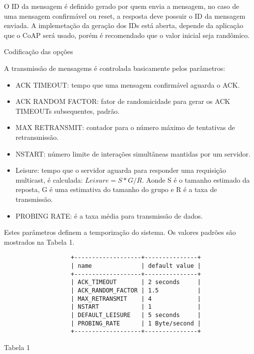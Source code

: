 O ID da mensagem \'e definido gerado por quem envia a mensagem, no caso de uma mensagem confirm\'avel ou reset, a resposta deve possuir o ID da mensagem enviada. A implemeta\c{c}\~ao da gera\c{c}\~ao dos IDs est\'a aberta, depende da aplica\c{c}\~ao que o CoAP ser\'a usado, por\'em \'e recomendado que o valor inicial seja rand\^omico.
   
Codifica\c{c}\~ao das op\c{c}\~oes

A transmiss\~ao de mensagems \'e controlada basicamente pelos par\^ametros:

\begin{itemize}
    \item ACK TIMEOUT: tempo que uma mensagem confirm\'avel aguarda o ACK.
    \item ACK RANDOM FACTOR: fator de randomicidade para gerar os ACK TIMEOUTs subsequentes, padr\~ao.
    \item MAX RETRANSMIT: contador para o n\'umero m\'aximo de tentativas de retransmiss\~ao.
    \item NSTART: n\'umero limite de intera\c{c}\~oes simult\^aneas mantidas por um servidor.
    \item Leisure: tempo que o servidor aguarda para responder uma requisi\c{c}\~ao multicast, \'e calculada: \begin{math}Leisure = S * G / R\end{math}. Aonde S \'e o tamanho estimado da reposta, G \'e uma estimativa do tamanho do grupo e R \'e a taxa de transmiss\~ao.
    \item PROBING RATE: \'e a taxa m\'edia para transmiss\~ao de dados.
\end{itemize}

Estes par\^ametros definem a temporiza\c{c}\~ao do sistema. Os valores padr\~oes s\~ao mostrados na Tabela 1.

\begin{verbatim}
                   +-------------------+---------------+
                   | name              | default value |
                   +-------------------+---------------+
                   | ACK_TIMEOUT       | 2 seconds     |
                   | ACK_RANDOM_FACTOR | 1.5           |
                   | MAX_RETRANSMIT    | 4             |
                   | NSTART            | 1             |
                   | DEFAULT_LEISURE   | 5 seconds     |
                   | PROBING_RATE      | 1 Byte/second |
                   +-------------------+---------------+
\end{verbatim}
Tabela 1


